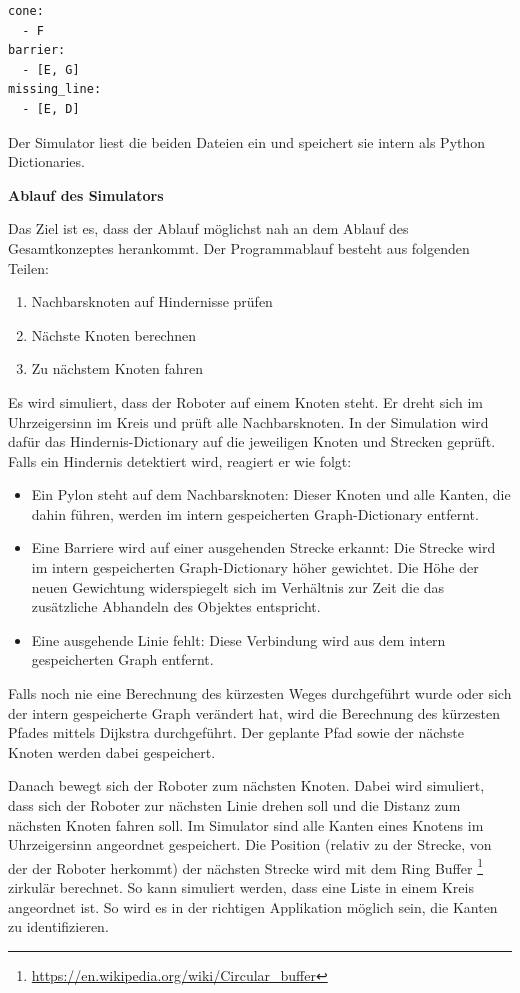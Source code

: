 \begin{verbatim}
cone:
  - F
barrier:
  - [E, G]
missing_line:
  - [E, D]
\end{verbatim}

Der Simulator liest die beiden Dateien ein und speichert sie intern als Python Dictionaries.

\textbf{Ablauf des Simulators}

Das Ziel ist es, dass der Ablauf möglichst nah an dem Ablauf des Gesamtkonzeptes herankommt.
Der Programmablauf besteht aus folgenden Teilen:
\begin{enumerate}
    \item Nachbarsknoten auf Hindernisse prüfen
    \item Nächste Knoten berechnen
    \item Zu nächstem Knoten fahren
\end{enumerate}

Es wird simuliert, dass der Roboter auf einem Knoten steht. Er dreht sich im Uhrzeigersinn im Kreis und prüft alle Nachbarsknoten. In der Simulation wird dafür das Hindernis-Dictionary auf die jeweiligen Knoten und Strecken geprüft. Falls ein Hindernis detektiert wird, reagiert er wie folgt:

\begin{itemize}
    \item Ein Pylon steht auf dem Nachbarsknoten: Dieser Knoten und alle Kanten, die dahin führen, werden im intern gespeicherten Graph-Dictionary entfernt.
    \item Eine Barriere wird auf einer ausgehenden Strecke erkannt: Die Strecke wird im intern gespeicherten Graph-Dictionary höher gewichtet. Die Höhe der neuen Gewichtung widerspiegelt sich im Verhältnis zur Zeit die das zusätzliche Abhandeln des Objektes entspricht.
    \item Eine ausgehende Linie fehlt: Diese Verbindung wird aus dem intern gespeicherten Graph entfernt.
\end{itemize}

Falls noch nie eine Berechnung des kürzesten Weges durchgeführt wurde oder sich der intern gespeicherte Graph verändert hat, wird die Berechnung des kürzesten Pfades mittels Dijkstra durchgeführt. Der geplante Pfad sowie der nächste Knoten werden dabei gespeichert.

Danach bewegt sich der Roboter zum nächsten Knoten. Dabei wird simuliert, dass sich der Roboter zur nächsten Linie drehen soll und die Distanz zum nächsten Knoten fahren soll. Im Simulator sind alle Kanten eines Knotens im Uhrzeigersinn angeordnet gespeichert. Die Position (relativ zu der Strecke, von der der Roboter herkommt) der nächsten Strecke wird mit dem Ring Buffer \footnote{\url{https://en.wikipedia.org/wiki/Circular\_buffer}} zirkulär berechnet. So kann simuliert werden, dass eine Liste in einem Kreis angeordnet ist. So wird es in der richtigen Applikation möglich sein, die Kanten zu identifizieren. 


